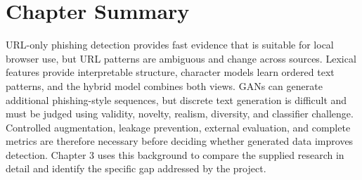 \section{Chapter Summary}

URL-only phishing detection provides fast evidence that is suitable for local
browser use, but URL patterns are ambiguous and change across sources. Lexical
features provide interpretable structure, character models learn ordered text
patterns, and the hybrid model combines both views. GANs can generate additional
phishing-style sequences, but discrete text generation is difficult and must be
judged using validity, novelty, realism, diversity, and classifier challenge.
Controlled augmentation, leakage prevention, external evaluation, and complete
metrics are therefore necessary before deciding whether generated data improves
detection. Chapter 3 uses this background to compare the supplied research in
detail and identify the specific gap addressed by the project.

